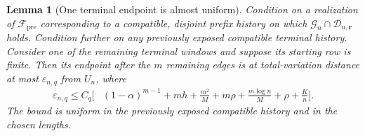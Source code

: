 \documentclass[11pt]{article}
\newcommand{\1}{\mathbf 1}
\newcommand{\cF}{\mathcal F}
\newcommand{\cG}{\mathcal G}
\newcommand{\cD}{\mathcal D}
\newcommand{\eps}{\varepsilon}
\newtheorem{lemma}[theorem]{Lemma}
\theoremstyle{definition}
\theoremstyle{remark}
\begin{document}
\begin{lemma}[One terminal endpoint is almost uniform]
\label{lem:terminal-uniform}
Condition on a realization of $\cF_{\mathrm{pre}}$ corresponding to a
compatible, disjoint prefix history on which $\cG_n\cap\cD_{n,\mathbf r}$ holds.
Condition further on any previously exposed compatible terminal history.
Consider one of the remaining terminal windows and suppose its starting
row is finite.  Then its endpoint after the $m$ remaining edges is at
total-variation distance at most $\eps_{n,q}$ from $U_n$, where
\begin{align}
 \eps_{n,q}\leq C_q\bigg[&
 (1-\alpha)^{m-1}
 +mh+\frac{m^2}{M}
 +m\rho+\frac{m\log n}{M}
 +\rho+\frac Kn
 \bigg].
 \label{eq:epsilon-terminal}
\end{align}
The bound is uniform in the previously exposed compatible history and in
the chosen lengths.
\end{lemma}
\end{document}
